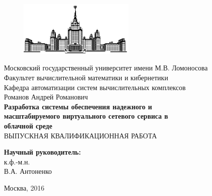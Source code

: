 \documentclass[oneside,final,14pt,a4paper]{extreport}
\begin{document}
\thispagestyle{empty}
\begin{titlepage}

\begin{figure}
	\centering
	\includegraphics[width=0.5\textwidth]{msu}\\
\end{figure}

\begin{spacing}{1.0} %
\begin{center} %
	{\small
		Московский государственный университет имени М.В. Ломоносова \\
		Факультет вычислительной математики и кибернетики \\
		Кафедра автоматизации систем вычислительных комплексов \\
	}
	\vspace{4cm}
	{\large Романов Андрей Романович \\}
	\vspace{1cm}
	{\large\bfseries
		Разработка системы обеспечения надежного и \\
		масштабируемого 	виртуального сетевого сервиса в \\
		облачной среде \\
	}
	\vspace{1cm}
	ВЫПУСКНАЯ КВАЛИФИКАЦИОННАЯ  РАБОТА
\end{center}
\vfill
\begin{flushright}
\begin{small}
	{\bfseries Научный руководитель: \\}
	к.ф.-м.н. \\
	В.А. Антоненко \\
\end{small}
\end{flushright}

\vfill

\centerline{Москва, 2016}
\end{spacing}
\end{titlepage}
\setcounter{page}{2}
\end{document}

